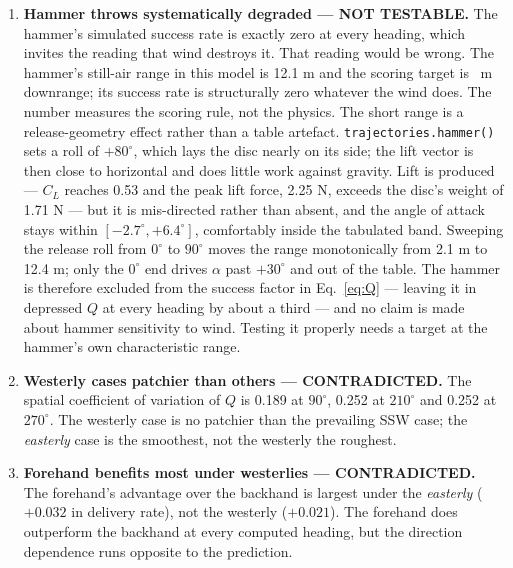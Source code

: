 \documentclass[11pt,letterpaper]{article}
\begin{document}
\begin{enumerate}[leftmargin=*,itemsep=4pt]
  \item \textbf{Hammer throws systematically degraded --- NOT TESTABLE.}
    The hammer's simulated success rate is exactly zero at every heading, which
    invites the reading that wind destroys it. That reading would be wrong. The
    hammer's still-air range in this model is 12.1 m and the scoring target is
    \TargetRange~m downrange; its success rate is structurally zero whatever the
    wind does. The number measures the scoring rule, not the physics.
    The short range is a release-geometry effect rather than a table artefact.
    \texttt{trajectories.hammer()} sets a roll of $+80^\circ$, which lays the disc nearly
    on its side; the lift vector is then close to horizontal and does little work against
    gravity. Lift is produced --- $C_L$ reaches 0.53 and the peak lift force, 2.25 N,
    exceeds the disc's weight of 1.71 N --- but it is mis-directed rather than absent, and
    the angle of attack stays within $[-2.7^\circ, +6.4^\circ]$, comfortably inside the
    tabulated band. Sweeping the release roll from $0^\circ$ to $90^\circ$ moves the range
    monotonically from 2.1 m to 12.4 m; only the $0^\circ$ end drives $\alpha$ past
    $+30^\circ$ and out of the table. The hammer
    is therefore excluded from the success factor in Eq.~\ref{eq:Q} --- leaving
    it in depressed $Q$ at every heading by about a third --- and no claim is
    made about hammer sensitivity to wind. Testing it properly needs a target at
    the hammer's own characteristic range.

  \item \textbf{Westerly cases patchier than others --- CONTRADICTED.} The
    spatial coefficient of variation of $Q$ is 0.189 at $90^\circ$, 0.252 at
    $210^\circ$ and 0.252 at $270^\circ$. The westerly case is no patchier than
    the prevailing SSW case; the \emph{easterly} case is the smoothest, not the
    westerly the roughest.

  \item \textbf{Forehand benefits most under westerlies --- CONTRADICTED.} The
    forehand's advantage over the backhand is largest under the \emph{easterly}
    ($+0.032$ in delivery rate), not the westerly ($+0.021$). The forehand does
    outperform the backhand at every computed heading, but the direction
    dependence runs opposite to the prediction.


\end{enumerate}
\end{document}
